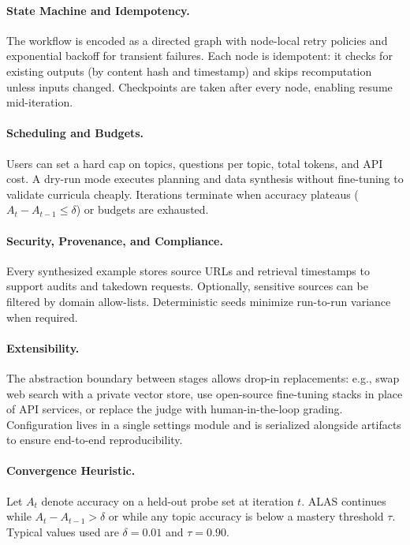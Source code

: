 \documentclass[11pt]{article}
\begin{document}
\paragraph{State Machine and Idempotency.} The workflow is encoded as a directed graph with node-local retry policies and exponential backoff for transient failures. Each node is idempotent: it checks for existing outputs (by content hash and timestamp) and skips recomputation unless inputs changed. Checkpoints are taken after every node, enabling resume mid-iteration.

\paragraph{Scheduling and Budgets.} Users can set a hard cap on topics, questions per topic, total tokens, and API cost. A dry-run mode executes planning and data synthesis without fine-tuning to validate curricula cheaply. Iterations terminate when accuracy plateaus ($A_t-A_{t-1} \leq \delta$) or budgets are exhausted.

\paragraph{Security, Provenance, and Compliance.} Every synthesized example stores source URLs and retrieval timestamps to support audits and takedown requests. Optionally, sensitive sources can be filtered by domain allow-lists. Deterministic seeds minimize run-to-run variance when required.

\paragraph{Extensibility.} The abstraction boundary between stages allows drop-in replacements: e.g., swap web search with a private vector store, use open-source fine-tuning stacks in place of API services, or replace the judge with human-in-the-loop grading. Configuration lives in a single settings module and is serialized alongside artifacts to ensure end-to-end reproducibility.

\paragraph{Convergence Heuristic.} Let \(A_t\) denote accuracy on a held-out probe set at iteration \(t\). ALAS continues while \(A_t - A_{t-1} > \delta\) or while any topic accuracy is below a mastery threshold \(\tau\). Typical values used are \(\delta=0.01\) and \(\tau=0.90\).
\end{document}
